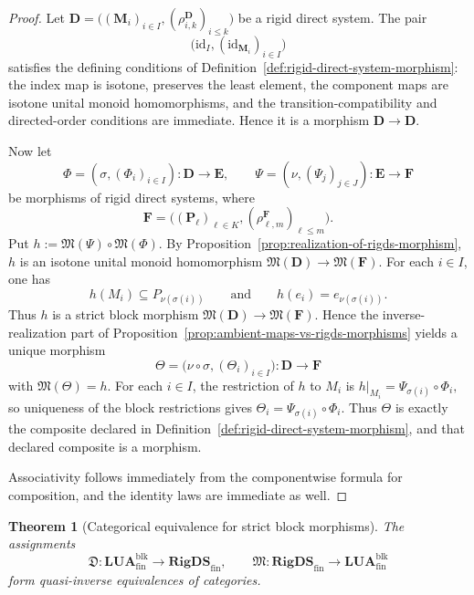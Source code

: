 \documentclass[pdflatex,sn-mathphys-num]{sn-jnl}
\theoremstyle{thmstyleone}%
\newtheorem{theorem}{Theorem}[section]
\theoremstyle{thmstyletwo}%
\theoremstyle{thmstylethree}%
\begin{document}
\begin{proof}
Let \(\mathbf D=\bigl((\mathbf M_i)_{i\in I},(\rho^{\mathbf D}_{i,k})_{i\le k}\bigr)\) be a rigid direct system.
The pair
\[
\bigl(\mathrm{id}_I,(\mathrm{id}_{\mathbf M_i})_{i\in I}\bigr)
\]
satisfies the defining conditions of Definition~\ref{def:rigid-direct-system-morphism}: the index map is isotone, preserves the least element, the component maps are isotone unital monoid homomorphisms, and the transition-compatibility and directed-order conditions are immediate.
Hence it is a morphism \(\mathbf D\to\mathbf D\).

Now let
\[
\Phi=(\sigma,(\Phi_i)_{i\in I})\colon \mathbf D\to \mathbf E,
\qquad
\Psi=(\nu,(\Psi_j)_{j\in J})\colon \mathbf E\to \mathbf F
\]
be morphisms of rigid direct systems, where
\[
\mathbf F=
\bigl((\mathbf P_\ell)_{\ell\in K},
(\rho^{\mathbf F}_{\ell,m})_{\ell\le m}\bigr).
\]
Put \(h:=\mathfrak M(\Psi)\circ \mathfrak M(\Phi)\).
By Proposition~\ref{prop:realization-of-rigds-morphism}, \(h\) is an isotone unital monoid homomorphism \(\mathfrak M(\mathbf D)\to \mathfrak M(\mathbf F)\).
For each \(i\in I\), one has
\[
h(M_i)\subseteq P_{\nu(\sigma(i))}
\qquad\text{and}\qquad
h(e_i)=e_{\nu(\sigma(i))}.
\]
Thus \(h\) is a strict block morphism \(\mathfrak M(\mathbf D)\to\mathfrak M(\mathbf F)\).
Hence the inverse-realization part of Proposition~\ref{prop:ambient-maps-vs-rigds-morphisms} yields a unique morphism
\[
\Theta=\bigl(\nu\circ\sigma,(\Theta_i)_{i\in I}\bigr)\colon \mathbf D\to \mathbf F
\]
with \(\mathfrak M(\Theta)=h\).
For each \(i\in I\), the restriction of \(h\) to \(M_i\) is \(h|_{M_i}=\Psi_{\sigma(i)}\circ \Phi_i,\) so uniqueness of the block restrictions gives \(\Theta_i=\Psi_{\sigma(i)}\circ \Phi_i\).
Thus \(\Theta\) is exactly the composite declared in Definition~\ref{def:rigid-direct-system-morphism}, and that declared composite is a morphism.

Associativity follows immediately from the componentwise formula for composition, and the identity laws are immediate as well.
\end{proof}

\begin{theorem}[Categorical equivalence for strict block morphisms]\label{thm:categorical-equivalence}
The assignments
\[
\mathfrak D\colon \mathbf{LUA}^{\mathrm{blk}}_{\mathrm{fin}}\to \mathbf{RigDS}_{\mathrm{fin}},
\qquad
\mathfrak M\colon \mathbf{RigDS}_{\mathrm{fin}}\to \mathbf{LUA}^{\mathrm{blk}}_{\mathrm{fin}}
\]
form quasi-inverse equivalences of categories.
\end{theorem}
\end{document}
